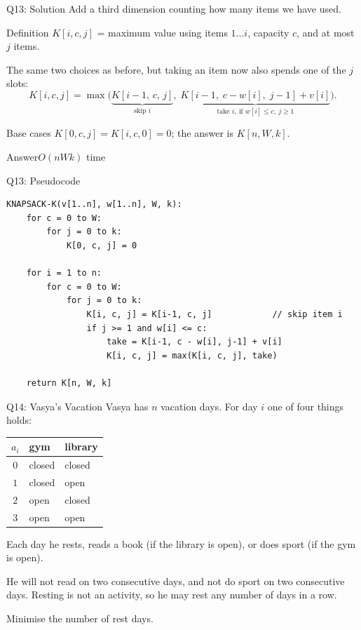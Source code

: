 \documentclass[10pt,aspectratio=169]{beamer}
\newcommand{\answer}[1]{\begin{alertblock}{Answer}#1\end{alertblock}}
\begin{document}
\begin{frame}{Q13: Solution}
  Add a \alert{third dimension} counting how many items we have used.

  \begin{block}{Definition}
    $K[i, c, j]$ = maximum value using items $1 \ldots i$, capacity $c$, and at
    most $j$ items.
  \end{block}

  \bigskip
  The same two choices as before, but taking an item now also spends one of the
  $j$ slots:
  \[
    K[i,c,j] = \max\big(
      \underbrace{K[i-1,\, c,\, j]}_{\text{skip } i},\;
      \underbrace{K[i-1,\; c-w[i],\; j-1] + v[i]}_{\text{take } i,\ \text{if } w[i] \le c,\ j \ge 1}
    \big).
  \]

  \bigskip
  Base cases $K[0,c,j] = K[i,c,0] = 0$; the answer is $K[n,W,k]$.

  \answer{$O(nWk)$ time}
\end{frame}

\begin{frame}[fragile]{Q13: Pseudocode}
  \begin{lstlisting}[style=pc]
KNAPSACK-K(v[1..n], w[1..n], W, k):
    for c = 0 to W:
        for j = 0 to k:
            K[0, c, j] = 0

    for i = 1 to n:
        for c = 0 to W:
            for j = 0 to k:
                K[i, c, j] = K[i-1, c, j]            // skip item i
                if j >= 1 and w[i] <= c:
                    take = K[i-1, c - w[i], j-1] + v[i]
                    K[i, c, j] = max(K[i, c, j], take)

    return K[n, W, k]
  \end{lstlisting}
\end{frame}


\begin{frame}{Q14: Vasya's Vacation}
  Vasya has $n$ vacation days. For day $i$ one of four things holds:

  \begin{center}
  \begin{tabular}{cll}
    \toprule
    $a_i$ & gym & library \\
    \midrule
    $0$ & closed & closed \\
    $1$ & closed & open \\
    $2$ & open   & closed \\
    $3$ & open   & open \\
    \bottomrule
  \end{tabular}
  \end{center}

  \bigskip
  Each day he rests, reads a book (if the library is open), or does sport (if
  the gym is open).

  \bigskip
  He will \alert{not read on two consecutive days}, and \alert{not do sport on
  two consecutive days}. Resting is not an activity, so he may rest any number
  of days in a row.

  \bigskip
  \begin{center}
    Minimise the number of rest days.
  \end{center}
\end{frame}
\end{document}
